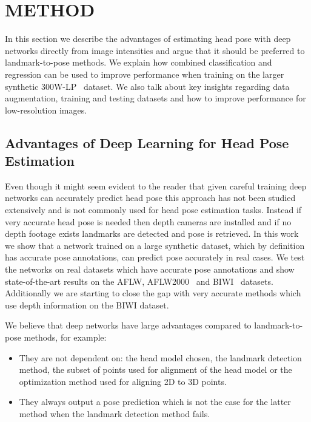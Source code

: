 \documentclass[10pt,twocolumn,letterpaper]{article}
\begin{document}

\section{METHOD}\label{sec3}

In this section we describe the advantages of estimating head pose with deep networks directly from image intensities and argue that it should be preferred to landmark-to-pose methods. We explain how combined classification and regression can be used to improve performance when training on the larger synthetic 300W-LP~\cite{zhu2016face} dataset. We also talk about key insights regarding data augmentation, training and testing datasets and how to improve performance for low-resolution images.

\subsection{Advantages of Deep Learning for Head Pose Estimation}\label{sec3-A}

Even though it might seem evident to the reader that given careful training deep networks can accurately predict head pose this approach has not been studied extensively and is not commonly used for head pose estimation tasks. Instead if very accurate head pose is needed then depth cameras are installed and if no depth footage exists landmarks are detected and pose is retrieved. In this work we show that a network trained on a large synthetic dataset, which by definition has accurate pose annotations, can predict pose accurately in real cases. We test the networks on real datasets which have accurate pose annotations and show state-of-the-art results on the AFLW, AFLW2000~\cite{zhu2016face} and BIWI~\cite{fanelli_IJCV} datasets. Additionally we are starting to close the gap with very accurate methods which use depth information on the BIWI dataset.

We believe that deep networks have large advantages compared to landmark-to-pose methods, for example:
\begin{itemize}
\itemsep0em 
  \item They are not dependent on: the head model chosen, the landmark detection method, the subset of points used for alignment of the head model or the optimization method used for aligning 2D to 3D points.
  
  \item They always output a pose prediction which is not the case for the latter method when the landmark detection method fails. %
\end{itemize}
\end{document}

